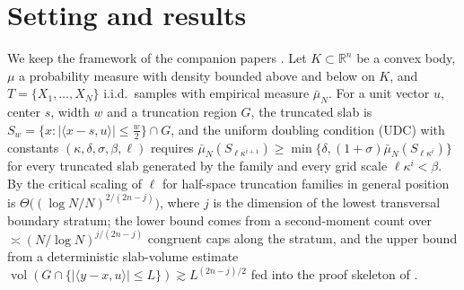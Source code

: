 \documentclass[11pt]{article}
\newcommand{\R}{\mathbb{R}}
\newcommand{\emp}{\bar\mu_N}
\newcommand{\vol}{\operatorname{vol}}
\begin{document}
\begin{abstract}
directions remains open, and we state the residual estimate precisely.  We also
prove a conditional uniform theorem: if iterated slices keep a uniform
curvature floor and all simultaneously projected near-tangent normals have a
uniform Gram lower bound, then the slab constants and the interpolation law are
uniform over that resolved subfamily.  As an immediate consequence, every
finite atlas of fixed curved configurations, and every compact atlas whose
resolved constants vary continuously and stay positive, has a uniform law with
atlas-dependent constants.  Resolved geometry is also stable under
\(C^2\)-small perturbations, so any compact \(C^2\)-continuous resolved atlas is
uniform by a finite subcover.  The same statement is locally uniform on every
compact stage of a \(\sigma\)-compact resolved atlas, and becomes globally
uniform exactly when the resolved constants have a positive global floor.  For
one curved truncation, the resolved hypotheses are automatic under quantitative
splaying, and also under an explicit curvature-dominance inequality that allows
controlled oblique intersections; in particular, nonobtuse one-cut contact is
uniform.
\end{abstract}

\section{Setting and results}\label{sec:intro}

We keep the framework of the companion papers
\cite{companion2,companion3,companion4,companion11,companion6}.  Let $K\subset\R^n$
be a convex body, $\mu$ a probability measure with density bounded above and
below on $K$, and $T=\{X_1,\dots,X_N\}$ i.i.d.\ samples with empirical measure
$\emp$.  For a unit vector $u$, center $s$, width $w$ and a truncation region
$G$, the truncated slab is
$S_w=\{x:|\langle x-s,u\rangle|\le\frac w2\}\cap G$, and the uniform doubling
condition (UDC) with constants $(\kappa,\delta,\sigma,\beta,\ell)$ requires
$\emp(S_{\ell\kappa^{i+1}})\ge\min\{\delta,(1+\sigma)\emp(S_{\ell\kappa^{i}})\}$
for every truncated slab generated by the family and every grid scale
$\ell\kappa^i<\beta$.  By \cite{companion3,companion4,companion11,companion6} the
critical scaling of $\ell$ for half-space truncation families in general
position is $\Theta\bigl((\log N/N)^{2/(2n-j)}\bigr)$, where $j$ is the
dimension of the lowest transversal boundary stratum; the lower bound comes
from a second-moment count over $\asymp(N/\log N)^{j/(2n-j)}$ congruent caps
along the stratum, and the upper bound from a deterministic slab-volume
estimate $\vol(G\cap\{|\langle y-x,u\rangle|\le L\})\gtrsim L^{(2n-j)/2}$ fed
into the proof skeleton of \cite{companion2}.
\end{document}
